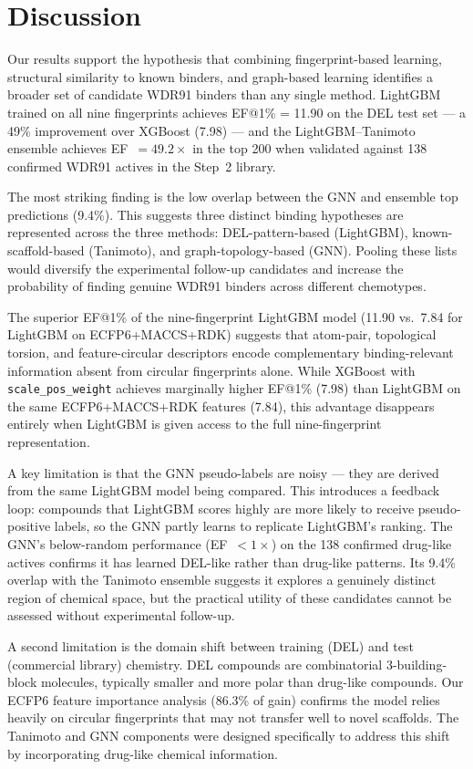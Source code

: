 \documentclass[10pt, letterpaper]{article}
\begin{document}
\section{Discussion}
Our results support the hypothesis that combining fingerprint-based learning, structural similarity to known binders, and graph-based learning identifies a broader set of candidate WDR91 binders than any single method. LightGBM trained on all nine fingerprints achieves EF@1\% = 11.90 on the DEL test set — a 49\% improvement over XGBoost (7.98) — and the LightGBM--Tanimoto ensemble achieves EF~$= 49.2\times$ in the top 200 when validated against 138 confirmed WDR91 actives in the Step~2 library.

The most striking finding is the low overlap between the GNN and ensemble top predictions (9.4\%). This suggests three distinct binding hypotheses are represented across the three methods: DEL-pattern-based (LightGBM), known-scaffold-based (Tanimoto), and graph-topology-based (GNN). Pooling these lists would diversify the experimental follow-up candidates and increase the probability of finding genuine WDR91 binders across different chemotypes.

The superior EF@1\% of the nine-fingerprint LightGBM model (11.90 vs.\ 7.84 for LightGBM on ECFP6+MACCS+RDK) suggests that atom-pair, topological torsion, and feature-circular descriptors encode complementary binding-relevant information absent from circular fingerprints alone. While XGBoost with \texttt{scale\_pos\_weight} achieves marginally higher EF@1\% (7.98) than LightGBM on the same ECFP6+MACCS+RDK features (7.84), this advantage disappears entirely when LightGBM is given access to the full nine-fingerprint representation.

A key limitation is that the GNN pseudo-labels are noisy — they are derived from the same LightGBM model being compared. This introduces a feedback loop: compounds that LightGBM scores highly are more likely to receive pseudo-positive labels, so the GNN partly learns to replicate LightGBM's ranking. The GNN's below-random performance (EF~$< 1\times$) on the 138 confirmed drug-like actives confirms it has learned DEL-like rather than drug-like patterns. Its 9.4\% overlap with the Tanimoto ensemble suggests it explores a genuinely distinct region of chemical space, but the practical utility of these candidates cannot be assessed without experimental follow-up.

A second limitation is the domain shift between training (DEL) and test (commercial library) chemistry. DEL compounds are combinatorial 3-building-block molecules, typically smaller and more polar than drug-like compounds. Our ECFP6 feature importance analysis (86.3\% of gain) confirms the model relies heavily on circular fingerprints that may not transfer well to novel scaffolds. The Tanimoto and GNN components were designed specifically to address this shift by incorporating drug-like chemical information.
\end{document}
